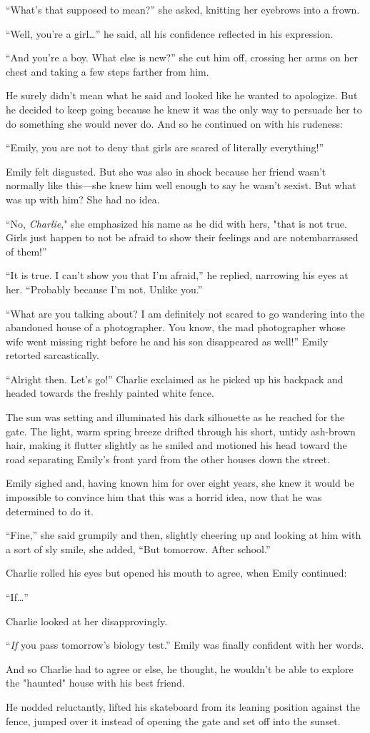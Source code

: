 “What’s that supposed to mean?” she asked, knitting her eyebrows into a frown.

“Well, you’re a girl…” he said, all his confidence reflected in his expression.

“And you’re a boy. What else is new?” she cut him off, crossing her arms on her chest and taking a few steps farther from him.

He surely didn’t mean what he said and looked like he wanted to apologize. But he decided to keep going because he knew it was the only way to persuade her to do something she would never do. And so he continued on with his rudeness:

“Emily, you are not to deny that girls are scared of literally everything!”

Emily felt disgusted. But she was also in shock because her friend wasn’t normally like this—she knew him well enough to say he wasn’t sexist. But what was up with him? She had no idea.

“No, \textit{Charlie}," she emphasized his name as he did with hers, "that is not true. Girls just happen to not be afraid to show their feelings and are notembarrassed of them!”

“It is true. I can’t show you that I’m afraid,” he replied, narrowing his eyes at her. “Probably because I’m not. Unlike you.”

“What are you talking about? I am definitely not scared to go wandering into the abandoned house of a photographer. You know, the mad photographer whose wife went missing right before he and his son disappeared as well!” Emily retorted sarcastically.

“Alright then. Let’s go!” Charlie exclaimed as he picked up his backpack and headed towards the freshly painted white fence.

The sun was setting and illuminated his dark silhouette as he reached for the gate. The light, warm spring breeze drifted    through his short, untidy ash-brown hair, making it flutter slightly as he smiled and motioned his head toward the road separating Emily’s front yard from the other houses down the street.

Emily sighed and, having known him for over eight years, she knew it would be impossible to convince him that this was a horrid idea, now that he was determined to do it.

“Fine,” she said grumpily and then, slightly cheering up and looking at him with a sort of sly smile, she added, “But tomorrow. After school.”

Charlie rolled his eyes but opened his mouth to agree, when Emily continued:

“If…”

Charlie looked at her disapprovingly.

“\textit{If} you pass tomorrow’s biology test.” Emily was finally confident with her words.

And so Charlie had to agree or else, he thought, he wouldn’t be able to explore the "haunted" house with his best friend.

He nodded reluctantly, lifted his skateboard from its leaning position against the fence, jumped over it instead of opening the gate and set off into the sunset.